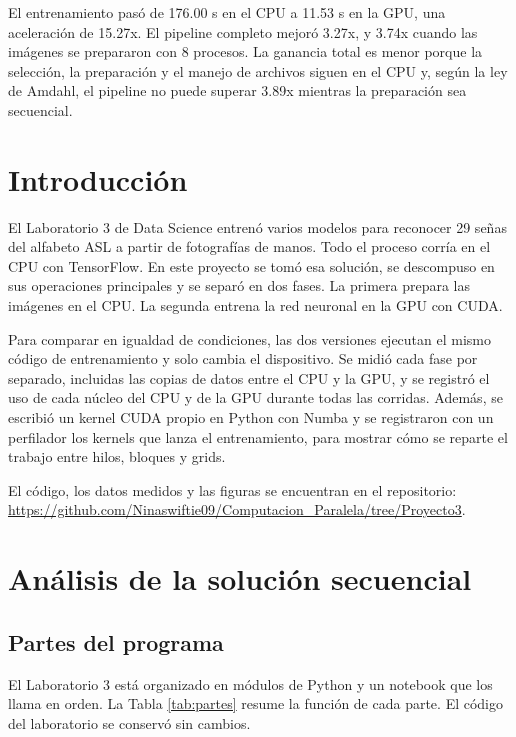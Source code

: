 \documentclass[11pt,letterpaper]{article}
\begin{document}
El entrenamiento pasó de 176.00 s en el CPU a 11.53 s en la GPU, una aceleración de 15.27x. El pipeline completo mejoró 3.27x, y 3.74x cuando las imágenes se prepararon con 8 procesos. La ganancia total es menor porque la selección, la preparación y el manejo de archivos siguen en el CPU y, según la ley de Amdahl, el pipeline no puede superar 3.89x mientras la preparación sea secuencial.

\section{Introducción}
El Laboratorio 3 de Data Science entrenó varios modelos para reconocer 29 señas del alfabeto ASL a partir de fotografías de manos. Todo el proceso corría en el CPU con TensorFlow. En este proyecto se tomó esa solución, se descompuso en sus operaciones principales y se separó en dos fases. La primera prepara las imágenes en el CPU. La segunda entrena la red neuronal en la GPU con CUDA.

Para comparar en igualdad de condiciones, las dos versiones ejecutan el mismo código de entrenamiento y solo cambia el dispositivo. Se midió cada fase por separado, incluidas las copias de datos entre el CPU y la GPU, y se registró el uso de cada núcleo del CPU y de la GPU durante todas las corridas. Además, se escribió un kernel CUDA propio en Python con Numba y se registraron con un perfilador los kernels que lanza el entrenamiento, para mostrar cómo se reparte el trabajo entre hilos, bloques y grids.

El código, los datos medidos y las figuras se encuentran en el repositorio:\\
\url{https://github.com/Ninaswiftie09/Computacion_Paralela/tree/Proyecto3}.

\section{Análisis de la solución secuencial}

\subsection{Partes del programa}
El Laboratorio 3 está organizado en módulos de Python y un notebook que los llama en orden. La Tabla \ref{tab:partes} resume la función de cada parte. El código del laboratorio se conservó sin cambios.
\end{document}
